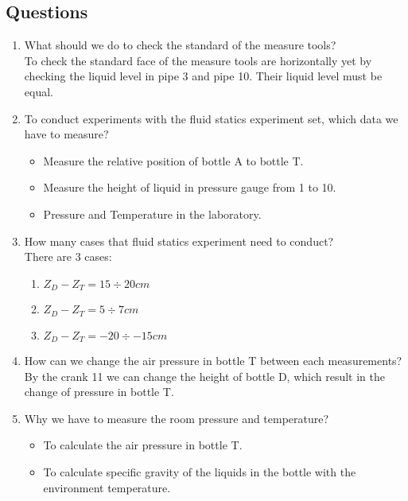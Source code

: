 \subsection{Questions}
\begin{enumerate}
	\item What should we do to check the standard of the measure tools?\\
	To check the standard face of the measure tools are horizontally yet by checking the liquid level in pipe 3 and pipe 10. Their liquid level must be equal.
	\item To conduct experiments with the fluid statics experiment set, which data we have to measure?
	\begin{itemize}[label=-]
		\item Measure the relative position of bottle A to bottle T.
		\item Measure the height of liquid in pressure gauge from 1 to 10.
		\item Pressure and Temperature in the laboratory.
	\end{itemize}
	\item How many cases that fluid statics experiment need to conduct?\\
	There are 3 cases:
	\begin{enumerate}
		\item $Z_D - Z_T = 15 \div 20cm$
		\item $Z_D - Z_T = 5 \div 7cm$
		\item $Z_D - Z_T = -20 \div -15cm$
	\end{enumerate}
	\item How can we change the air pressure in bottle T between each measurements?\\
	By the crank 11 we can change the height of bottle D, which result in the change of pressure in bottle T.
	\item Why we have to measure the room pressure and temperature?
	\begin{itemize}[label=-]
		\item To calculate the air pressure in bottle T.
		\item To calculate specific gravity of the liquids in the bottle with the environment temperature.
	\end{itemize}
\end{enumerate}

